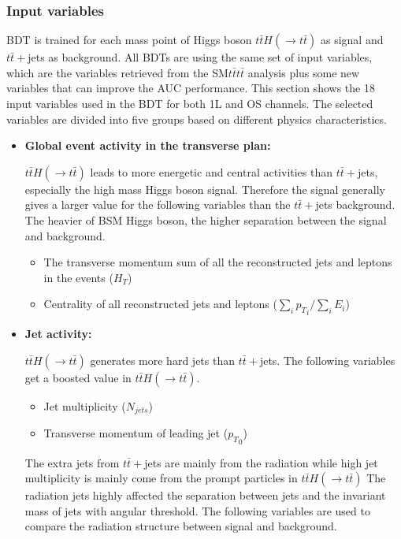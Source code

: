 %
\graphicspath{{figures/mva_bdt/}}
\subsubsection{Input variables}
\label{sec:BDT-input-variables}

BDT is trained for each mass point of Higgs boson $t\bar{t}H(\rightarrow t\bar{t})$ as signal and $t\bar{t}+$jets as background. 
All BDTs are using the same set of input variables, which are the variables retrieved from the SM$t\bar{t}t\bar{t}$ analysis plus some new variables that can improve the AUC performance. 
This section shows the 18 input variables used in the BDT for both 1L and OS channels.
The selected variables are divided into five groups based on different physics characteristics.

\begin{itemize}
\item \textbf{Global event activity in the transverse plan:}

$t\bar{t}H(\rightarrow t\bar{t})$ leads to more energetic and central activities than $t\bar{t}+$jets, especially the high mass Higgs boson signal.
Therefore the signal generally gives a larger value for the following variables than the $t\bar{t}+$jets background.
The heavier of BSM Higgs boson, the higher separation between the signal and background.

\begin{itemize}
\item The transverse momentum sum of all the reconstructed jets and leptons in the events ($H_{T}$)
\item Centrality of all reconstructed jets and leptons ($\sum_{i} {p_{T}}_{i} / \sum_{i} E_{i}$)  
\end{itemize}
\item \textbf{Jet activity:}

$t\bar{t}H(\rightarrow t\bar{t})$ generates more hard jets than $t\bar{t}+$jets.
The following variables get a boosted value in $t\bar{t}H(\rightarrow t\bar{t})$.

\begin{itemize}
\item Jet multiplicity ($N_{jets}$)
\item Transverse momentum of leading jet (${p_{T}}_{0}$)
\end{itemize}

The extra jets from $t\bar{t}+$jets are mainly from the radiation while high jet multiplicity is mainly come from the prompt particles in $t\bar{t}H(\rightarrow t\bar{t})$
The radiation jets highly affected the separation between jets and the invariant mass of jets with angular threshold.
The following variables are used to compare the radiation structure between signal and background.


\end{itemize}
